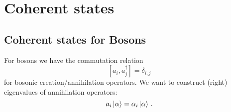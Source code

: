 \documentclass[../classnotes.tex]{subfiles}
\begin{document}
\chapter{Coherent states}


\section{Coherent states for Bosons}

For bosons we have the commutation relation 
\begin{equation}
    \left[a_i, a_j^{\dagger}\right] = \delta_{i,j}
\end{equation}
for bosonic creation/annihilation operators.
We want to construct (right) eigenvalues of annihilation operators:
\begin{equation}
    a_i \ket{\alpha} = \alpha_i \ket{\alpha}\,.
\end{equation}
\end{document}
